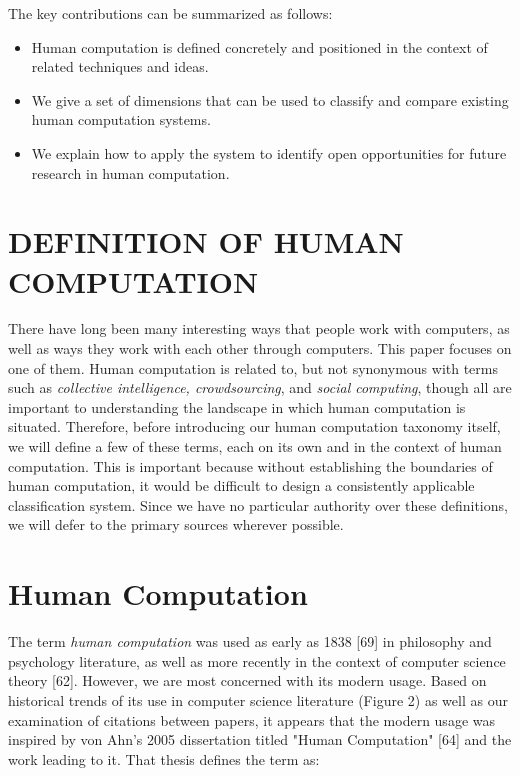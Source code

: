 \documentclass{acm_proc_article-sp}
\begin{document}
The key contributions can be summarized as follows:
\begin{itemize}
 \item  Human computation is defined concretely and positioned in the context of related techniques and ideas.

\item We give a set of dimensions that can be used to classify and compare existing human computation systems.

\item We explain how to apply the system to identify open opportunities for future research in human computation.
\end{itemize}
\section*{DEFINITION OF HUMAN COMPUTATION}
There have long been many interesting ways that people work with computers, as well as ways they work with each other through computers. This paper focuses on one of them. Human computation is related to, but not synonymous with terms such as \textit{collective intelligence, crowdsourcing}, and \textit{social computing}, though all are important to understanding the landscape in which human computation is situated. Therefore, before introducing our human computation taxonomy itself, we will define a few of these terms, each on its own and in the context of human computation. This is important because without establishing the boundaries of human computation, it would be difficult to design a consistently applicable classification system. Since we have no particular authority over these definitions, we will defer to the primary sources wherever possible.
\section*{Human Computation}
The term \textit{human computation} was used as early as 1838 [69] in philosophy and psychology literature, as well as more recently in the context of computer science theory [62]. However, we are most concerned with its modern usage. Based on historical trends of its use in computer science literature (Figure 2) as well as our examination of citations between papers, it appears that the modern usage was inspired by von Ahn's 2005 dissertation titled "Human Computation" [64] and the work leading to it. That thesis defines the term as:
\end{document}
